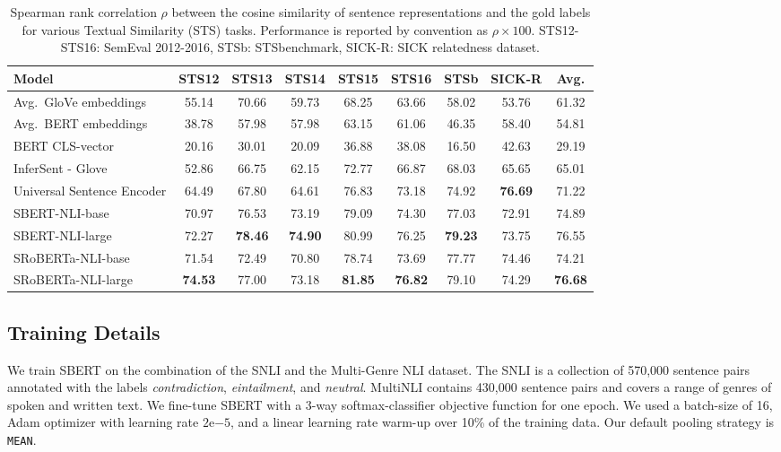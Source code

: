 \documentclass[11pt,a4paper]{article}
\begin{document}
\begin{table*}[t]
	\centering 
	\footnotesize
	\begin{tabular}{|l|c|c|c|c|c|c|c||c|}
		\hline
		\textbf{Model} & \textbf{STS12} & \textbf{STS13} & \textbf{STS14} & \textbf{STS15} & \textbf{STS16} & \textbf{STSb} & \textbf{SICK-R} & \textbf{Avg.} \\ \hline
		Avg.\ GloVe embeddings & 55.14 & 70.66 & 59.73 & 68.25 & 63.66 & 58.02 & 53.76 & 61.32 \\
		Avg.\ BERT embeddings & 38.78 & 57.98 & 57.98 & 63.15 & 61.06 & 46.35 & 58.40 & 54.81 \\
		BERT CLS-vector & 20.16 & 30.01 & 20.09 & 36.88 & 38.08 & 16.50 & 42.63 & 29.19 \\
		InferSent - Glove & 52.86 & 66.75 & 62.15 & 72.77 & 66.87 & 68.03 & 65.65 &  65.01 \\
		Universal Sentence Encoder & 64.49 & 67.80 & 64.61 & 76.83 & 73.18 & 74.92 & \textbf{76.69} & 71.22 \\ \hline
		SBERT-NLI-base & 70.97 & 76.53 & 73.19 & 79.09 & 74.30 & 77.03 & 72.91 & 74.89 \\
		SBERT-NLI-large & {72.27} & \textbf{78.46} & \textbf{74.90} & {80.99} & {76.25} & \textbf{79.23} & 73.75 & {76.55} \\ \hline 
		SRoBERTa-NLI-base & 71.54 & 72.49 & 70.80 & 78.74 & 73.69 & 77.77 & 74.46 & 74.21  \\ 
		SRoBERTa-NLI-large & \textbf{74.53} & 77.00 & 73.18 & \textbf{81.85} & \textbf{76.82} & 79.10 & 74.29 & \textbf{76.68} \\ \hline
	\end{tabular}
	\caption{Spearman rank correlation $\rho$ between the cosine similarity of sentence representations and the gold labels for various Textual Similarity (STS) tasks. Performance is reported by convention as $\rho \times 100$. STS12-STS16: SemEval 2012-2016, STSb: STSbenchmark, SICK-R: SICK relatedness dataset.}
	\label{table_sts_tasks}
\end{table*}


\subsection{Training Details}
We train SBERT on the combination of the SNLI \cite{snli} and the Multi-Genre NLI \cite{multinli} dataset. The SNLI is a collection of 570,000 sentence pairs annotated with the labels \textit{contradiction}, \textit{eintailment}, and \textit{neutral}. MultiNLI contains 430,000 sentence pairs and covers a range of genres of spoken and written text. We fine-tune SBERT with a 3-way softmax-classifier objective function for one epoch. We used a batch-size of 16, Adam optimizer with learning rate $2\mathrm{e}{-5}$, and a linear learning rate warm-up over 10\% of the training data. Our default pooling strategy is \texttt{MEAN}.
\end{document}
